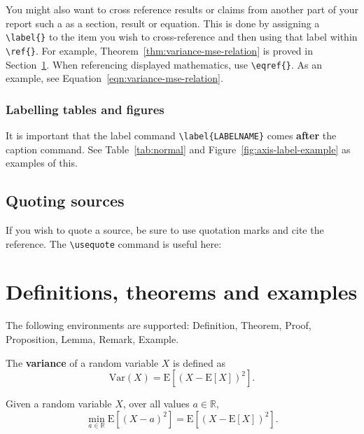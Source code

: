 You might also want to cross reference results or claims from another part of your report such a as a section, result or equation. This is done by assigning a \texttt{\textbackslash label\{\}} to the item you wish to cross-reference and then using that label within \texttt{\textbackslash ref\{\}}. For example, Theorem~\ref{thm:variance-mse-relation} is proved in Section~\ref{sec:defnthms}. When referencing displayed mathematics, use \texttt{\textbackslash eqref\{\}}. As an example, see 
Equation~\eqref{eqn:variance-mse-relation}.

\subsubsection{Labelling tables and figures}

It is important that the label command
\texttt{\textbackslash label\{LABELNAME\}} comes \textbf{after} the caption command.
See Table~\ref{tab:normal} and Figure~\ref{fig:axis-label-example} as examples of this.

\subsection{Quoting sources}
If you wish to quote a source, be sure to use quotation marks and cite the
reference. The \texttt{\textbackslash{usequote}} command is useful here:


\section{Definitions, theorems and examples}
\label{sec:defnthms}

The following environments are supported:
Definition, Theorem, Proof, Proposition, Lemma, Remark, Example.

\begin{definition} \label{defn:variance}
    The \textbf{variance} of a random variable $X$ is defined as
    \begin{equation} \label{eqn:variance-definition}
        \mathrm{Var}(X) = \mathrm{E}[(X - \mathrm{E}[X])^2].
    \end{equation}
\end{definition}

\begin{theorem} \label{thm:variance-mse-relation}
Given a random variable $X$, over all values $a \in \mathbb{R}$, 
\begin{equation}
    \min_{a \in \mathbb{R}} \mathrm{E}[(X - a)^2] 
    = \mathrm{E}[(X - \mathrm{E}[X])^2].
    \label{eqn:variance-mse-relation}
\end{equation}
\end{theorem}

